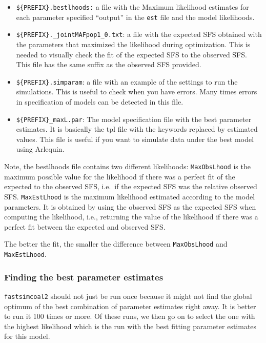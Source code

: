 \documentclass[
  letterpaper,
  DIV=11,
  numbers=noendperiod]{scrartcl}
\providecommand{\tightlist}{%
  \setlength{\itemsep}{0pt}\setlength{\parskip}{0pt}}\usepackage{longtable,booktabs,array}
\begin{document}
\begin{itemize}
\tightlist
\item
  \texttt{\$\{PREFIX\}.bestlhoods:} a file with the Maximum likelihood
  estimates for each parameter specified ``output'' in the \texttt{est}
  file and the model likelihoods.
\item
  \texttt{\$\{PREFIX\}.\_jointMAFpop1\_0.txt}: a file with the expected
  SFS obtained with the parameters that maximized the likelihood during
  optimization. This is needed to visually check the fit of the expected
  SFS to the observed SFS. This file has the same suffix as the observed
  SFS provided.
\item
  \texttt{\$\{PREFIX\}.simparam}: a file with an example of the settings
  to run the simulations. This is useful to check when you have errors.
  Many times errors in specification of models can be detected in this
  file.
\item
  \texttt{\$\{PREFIX\}\_maxL.par}: The model specification file with the
  best parameter estimates. It is basically the tpl file with the
  keywords replaced by estimated values. This file is useful if you want
  to simulate data under the best model using Arlequin.
\end{itemize}

Note, the bestlhoods file contains two different likelihoods:
\texttt{MaxObsLhood} is the maximum possible value for the likelihood if
there was a perfect fit of the expected to the observed SFS, i.e.~if the
expected SFS was the relative observed SFS. \texttt{MaxEstLhood} is the
maximum likelihood estimated according to the model parameters. It is
obtained by using the observed SFS as the expected SFS when computing
the likelihood, i.e., returning the value of the likelihood if there was
a perfect fit between the expected and observed SFS.

The better the fit, the smaller the difference between
\texttt{MaxObsLhood} and \texttt{MaxEstLhood}.

\hypertarget{finding-the-best-parameter-estimates}{%
\subsubsection{Finding the best parameter
estimates}\label{finding-the-best-parameter-estimates}}

\texttt{fastsimcoal2} should not just be run once because it might not
find the global optimum of the best combination of parameter estimates
right away. It is better to run it 100 times or more. Of these runs, we
then go on to select the one with the highest likelihood which is the
run with the best fitting parameter estimates for this model.
\end{document}
